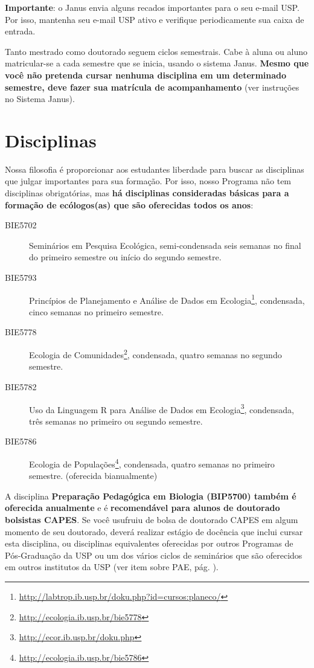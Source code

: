 \textbf{Importante}: o Janus envia alguns recados importantes para o
seu e-mail USP. Por isso, mantenha seu e-mail USP ativo e verifique
periodicamente sua caixa de entrada.

Tanto mestrado como doutorado seguem ciclos semestrais. Cabe à aluna
ou aluno matricular-se a cada semestre que se inicia, usando o sistema
Janus. \textbf{Mesmo que você não pretenda cursar nenhuma disciplina em um
determinado semestre, deve fazer sua matrícula de acompanhamento} (ver
instruções no Sistema Janus).

\section{Disciplinas}
\label{sec:disciplinas}

Nossa filosofia é proporcionar aos estudantes liberdade para buscar as disciplinas
que julgar importantes para sua formação. Por isso, nosso Programa não
tem disciplinas obrigatórias, mas \textbf{há  disciplinas
  consideradas básicas para a formação de ecólogos(as) que são oferecidas
  todos os anos}:


\begin{description}
  \item[BIE5702] Seminários em Pesquisa Ecológica, semi-condensada seis semanas no final do primeiro semestre ou início do segundo semestre. 
  \item[BIE5793] Princípios de Planejamento e Análise de Dados em Ecologia\footnote{\url{http://labtrop.ib.usp.br/doku.php?id=cursos:planeco/}}, condensada, cinco semanas no primeiro semestre.
  \item[BIE5778] Ecologia de Comunidades\footnote{\url{http://ecologia.ib.usp.br/bie5778}}, condensada, quatro semanas no segundo semestre.
  \item[BIE5782] Uso da Linguagem R para Análise de Dados em Ecologia\footnote{\url{http://ecor.ib.usp.br/doku.php}}, condensada, três semanas no primeiro ou segundo semestre.
  \item[BIE5786] Ecologia de Populações\footnote{\url{http://ecologia.ib.usp.br/bie5786}}, condensada, quatro semanas no primeiro semestre. (oferecida bianualmente)
\end{description}

A disciplina \textbf{Preparação Pedagógica em Biologia (BIP5700)
  também é oferecida anualmente} e é \textbf{recomendável para alunos
  de doutorado bolsistas CAPES}. Se você usufruiu de bolsa de
doutorado CAPES em algum momento de seu doutorado, deverá realizar
estágio de docência que inclui cursar esta disciplina, ou disciplinas
equivalentes oferecidas por outros Programas de Pós-Graduação da USP
ou um dos vários ciclos de seminários que são oferecidos em outros
institutos da USP (ver item sobre PAE, pág. \pageref{subsec:pae}).

